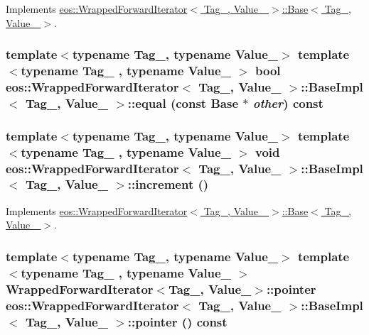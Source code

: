 Implements \hyperlink{structeos_1_1WrappedForwardIterator_1_1Base_a146a4e18680684f22bb7ca73f662718d}{eos::WrappedForwardIterator$<$ Tag\_\-, Value\_\- $>$::Base$<$ Tag\_\-, Value\_\- $>$}.\hypertarget{structeos_1_1WrappedForwardIterator_1_1BaseImpl_a07f6ef7a9f4c21de044aca1d09aed9f7}{
\subsubsection[{equal}]{\setlength{\rightskip}{0pt plus 5cm}template$<$typename Tag\_\-, typename Value\_\-$>$ template$<$typename Tag\_\- , typename Value\_\- $>$ bool {\bf eos::WrappedForwardIterator}$<$ Tag\_\-, Value\_\- $>$::{\bf BaseImpl}$<$ Tag\_\-, Value\_\- $>$::equal (const {\bf Base} $\ast$ {\em other}) const}}
\label{structeos_1_1WrappedForwardIterator_1_1BaseImpl_a07f6ef7a9f4c21de044aca1d09aed9f7}
\hypertarget{structeos_1_1WrappedForwardIterator_1_1BaseImpl_ac6565ae3236b5b128d671a1011f9c9ee}{
\subsubsection[{increment}]{\setlength{\rightskip}{0pt plus 5cm}template$<$typename Tag\_\-, typename Value\_\-$>$ template$<$typename Tag\_\- , typename Value\_\- $>$ void {\bf eos::WrappedForwardIterator}$<$ Tag\_\-, Value\_\- $>$::{\bf BaseImpl}$<$ Tag\_\-, Value\_\- $>$::increment ()}}
\label{structeos_1_1WrappedForwardIterator_1_1BaseImpl_ac6565ae3236b5b128d671a1011f9c9ee}


Implements \hyperlink{structeos_1_1WrappedForwardIterator_1_1Base_a7ab151df86128ddc4e98c64211829544}{eos::WrappedForwardIterator$<$ Tag\_\-, Value\_\- $>$::Base$<$ Tag\_\-, Value\_\- $>$}.\hypertarget{structeos_1_1WrappedForwardIterator_1_1BaseImpl_ad11775ce759f6aa3eff84e67b5e859fd}{
\subsubsection[{pointer}]{\setlength{\rightskip}{0pt plus 5cm}template$<$typename Tag\_\-, typename Value\_\-$>$ template$<$typename Tag\_\- , typename Value\_\- $>$ {\bf WrappedForwardIterator}$<$Tag\_\-, Value\_\-$>$::pointer {\bf eos::WrappedForwardIterator}$<$ Tag\_\-, Value\_\- $>$::{\bf BaseImpl}$<$ Tag\_\-, Value\_\- $>$::pointer () const}}
\label{structeos_1_1WrappedForwardIterator_1_1BaseImpl_ad11775ce759f6aa3eff84e67b5e859fd}


